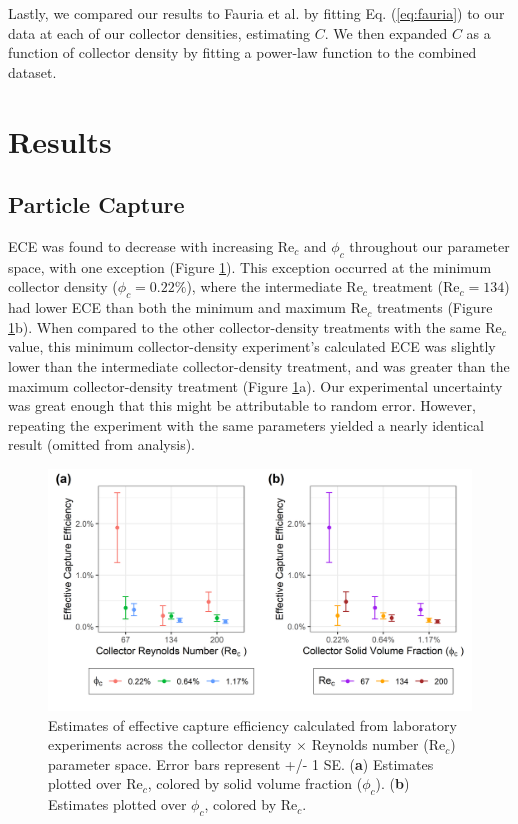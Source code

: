 \documentclass[geosciences,article,submit,moreauthors,pdftex]{Definitions/mdpi}
\newcommand\Rey{\mathrm{Re}}
\begin{document}
Lastly, we compared our results to Fauria et al. \cite{Fauria_2015} by fitting Eq. (\ref{eq:fauria}) to our data at each of our collector densities, estimating $C$. We then expanded $C$ as a function of collector density by fitting a power-law function to the combined dataset.

\section{Results}

\subsection{Particle Capture}

ECE was found to decrease with increasing $\Rey_c$ and $\phi_c$ throughout our parameter space, with one exception (Figure \ref{fig:ece}). This exception occurred at the minimum collector density ($\phi_c = 0.22\%$), where the intermediate $\Rey_c$ treatment ($\Rey_c = 134$) had lower ECE than both the minimum and maximum $\Rey_c$ treatments (Figure \ref{fig:ece}b). When compared to the other collector-density treatments with the same $\Rey_c$ value, this minimum collector-density experiment's calculated ECE was slightly lower than the intermediate collector-density treatment, and was greater than the maximum collector-density treatment (Figure \ref{fig:ece}a). Our experimental uncertainty was great enough that this might be attributable to random error. However, repeating the experiment with the same parameters yielded a nearly identical result (omitted from analysis).

\begin{figure}[H]
\centering
\includegraphics[width=5in]{../pics/ece_plot.png}
\caption{Estimates of effective capture efficiency calculated from laboratory experiments across the collector density $\times$ Reynolds number ($\Rey_c$) parameter space. Error bars represent +/- 1 SE. (\textbf{a}) Estimates plotted over $\Rey_c$, colored by solid volume fraction ($\phi_c$). (\textbf{b}) Estimates plotted over $\phi_c$, colored by $\Rey_c$.}
\label{fig:ece}
\end{figure}   
\end{document}
